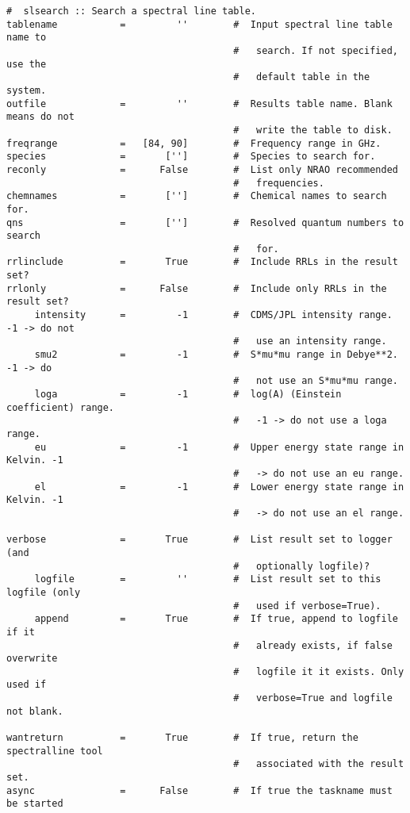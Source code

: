 \small
\begin{verbatim}
#  slsearch :: Search a spectral line table.
tablename           =         ''        #  Input spectral line table name to
                                        #   search. If not specified, use the
                                        #   default table in the system.
outfile             =         ''        #  Results table name. Blank means do not
                                        #   write the table to disk.
freqrange           =   [84, 90]        #  Frequency range in GHz.
species             =       ['']        #  Species to search for.
reconly             =      False        #  List only NRAO recommended
                                        #   frequencies.
chemnames           =       ['']        #  Chemical names to search for.
qns                 =       ['']        #  Resolved quantum numbers to search
                                        #   for.
rrlinclude          =       True        #  Include RRLs in the result set?
rrlonly             =      False        #  Include only RRLs in the result set?
     intensity      =         -1        #  CDMS/JPL intensity range. -1 -> do not
                                        #   use an intensity range.
     smu2           =         -1        #  S*mu*mu range in Debye**2. -1 -> do
                                        #   not use an S*mu*mu range.
     loga           =         -1        #  log(A) (Einstein coefficient) range.
                                        #   -1 -> do not use a loga range.
     eu             =         -1        #  Upper energy state range in Kelvin. -1
                                        #   -> do not use an eu range.
     el             =         -1        #  Lower energy state range in Kelvin. -1
                                        #   -> do not use an el range.

verbose             =       True        #  List result set to logger (and
                                        #   optionally logfile)?
     logfile        =         ''        #  List result set to this logfile (only
                                        #   used if verbose=True).
     append         =       True        #  If true, append to logfile if it
                                        #   already exists, if false overwrite
                                        #   logfile it it exists. Only used if
                                        #   verbose=True and logfile not blank.

wantreturn          =       True        #  If true, return the spectralline tool
                                        #   associated with the result set.
async               =      False        #  If true the taskname must be started
    
\end{verbatim}
\normalsize

